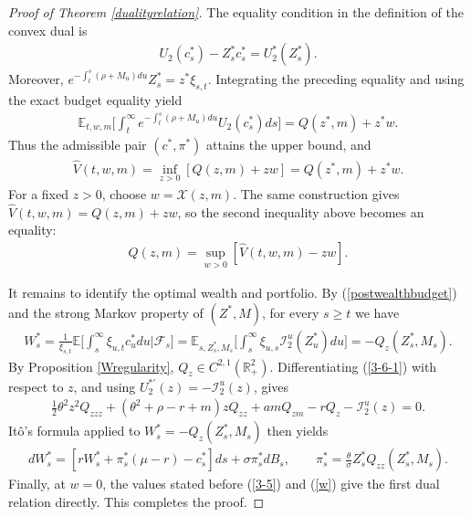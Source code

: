 \documentclass[a4paper,11pt]{amsart}
\numberwithin{equation}{section}
\begin{document}
{\begin{proof}[Proof of Theorem \ref{dualityrelation}]
The equality condition in the definition of the convex dual is
\begin{align*}
U_2(c_s^\ast)-Z_s^\ast c_s^\ast=U_2^\ast(Z_s^\ast).
\end{align*}
Moreover, $e^{-\int_t^s(\rho+M_u)du}Z_s^\ast=z^\ast\xi_{s,t}$. Integrating the preceding equality and using the exact budget equality yield
\begin{align*}
\mathbb E_{t,w,m}\bigg[\int_t^\infty e^{-\int_t^s(\rho+M_u)du}U_2(c_s^\ast)ds\bigg]=Q(z^\ast,m)+z^\ast w.
\end{align*}
Thus the admissible pair $(c^\ast,\pi^\ast)$ attains the upper bound, and
\begin{align*}
\widehat V(t,w,m)=\inf_{z>0}[Q(z,m)+zw]=Q(z^\ast,m)+z^\ast w.
\end{align*}
For a fixed $z>0$, choose $w=\mathcal X(z,m)$. The same construction gives $\widehat V(t,w,m)=Q(z,m)+zw$, so the second inequality above becomes an equality:
\begin{align*}
Q(z,m)=\sup_{w>0}[\widehat V(t,w,m)-zw].
\end{align*}

It remains to identify the optimal wealth and portfolio. By (\ref{postwealthbudget}) and the strong Markov property of $(Z^\ast,M)$, for every $s\geq t$ we have
\begin{align*}
W_s^\ast=\frac{1}{\xi_{s,t}}\mathbb E\bigg[\int_s^\infty\xi_{u,t}c_u^\ast du\bigg|\mathcal F_s\bigg]=\mathbb E_{s,Z_s^\ast,M_s}\bigg[\int_s^\infty\xi_{u,s}\mathcal I_2^u(Z_u^\ast)du\bigg]=-Q_z(Z_s^\ast,M_s).
\end{align*}
By Proposition \ref{Wregularity}, $Q_z\in C^{2,1}(\mathbb R_+^2)$. Differentiating (\ref{3-6-1}) with respect to $z$, and using $U_2^{\ast\prime}(z)=-\mathcal I_2^u(z)$, gives
\begin{align*}
\frac{1}{2}\theta^2z^2Q_{zzz}+(\theta^2+\rho-r+m)zQ_{zz}+amQ_{zm}-rQ_z-\mathcal I_2^u(z)=0.
\end{align*}
It\^o's formula applied to $W_s^\ast=-Q_z(Z_s^\ast,M_s)$ then yields
\begin{align*}
dW_s^\ast=[rW_s^\ast+\pi_s^\ast(\mu-r)-c_s^\ast]ds+\sigma\pi_s^\ast dB_s,\qquad \pi_s^\ast=\frac{\theta}{\sigma}Z_s^\ast Q_{zz}(Z_s^\ast,M_s).
\end{align*}
Finally, at $w=0$, the values stated before (\ref{3-5}) and (\ref{w}) give the first dual relation directly.  This completes the proof.
\end{proof}






}
\end{document}

